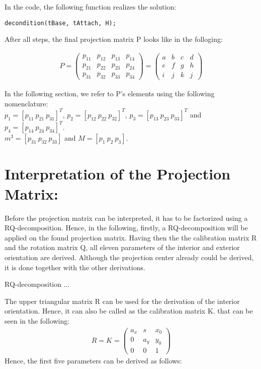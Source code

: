 \documentclass[a4paper,headings=small]{scrartcl}
\numberwithin{equation}{section} %
\numberwithin{figure}{section}   %
\begin{document}
In the code, the following function realizes the solution:
\begin{lstlisting}
decondition(tBase, tAttach, H);
\end{lstlisting}

After all steps, the final projection matrix P looks like in the folloging:

\begin{align}
P=
\left( \begin{array}{cccc}
p_{11} & p_{12} & p_{13} & p_{14} \\
p_{21} & p_{22} & p_{23} & p_{24} \\
p_{31} & p_{32} & p_{33} & p_{34}
\end{array} \right) 
=
\left( \begin{array}{cccc}
a & b & c & d \\
e & f & g & h \\
i & j & k & j
\end{array} \right) 
\end{align}

In the following section, we refer to P's elements using the following nomenclature:\\
$p_1=[p_{11} \  p_{21} \  p_{31}]^T$, $p_2=[p_{12} \  p_{22} \  p_{32}]^T$, $p_3=[p_{13} \  p_{23} \  p_{33}]^T$ and $p_4=[p_{14} \  p_{24} \  p_{34}]^T$.\\
$m^{3}=[p_{31} \  p_{32} \  p_{33}]$ and $M=[p_{1} \  p_{2} \  p_{3}]$.

\section{Interpretation of the Projection Matrix:}

Before the projection matrix can be interpreted, it has to be factorized using a RQ-decomposition.
Hence, in the following, firstly, a RQ-decomposition will be applied on the found projection matrix.
Having then the the calibration matrix R and the rotation matrix Q,
all eleven parameters of the interior and exterior orientation are derived.
Although the projection center already could be derived, it is done together with the other derivations.

RQ-decomposition ...

The upper triangular matrix R can be used for the derivation of the interior orientation.
Hence, it can also be called as the calibration matrix K. that can be seen in the following:
\begin{align}
R=K=
\left( \begin{array}{ccc}
a_x & s   & x_0 \\
0   & a_y & y_0 \\
0   & 0   & 1
\end{array} \right) 
\end{align}
Hence, the first five parameters can be derived as follows:
\end{document}
